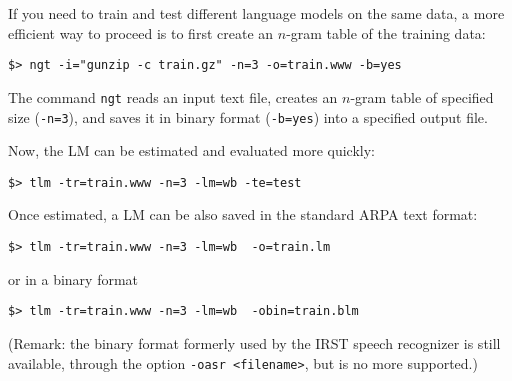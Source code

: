 \noindent
If you need  to train and test different language  models on the same data, a  more efficient 
way to  proceed is to first  create an $n$-gram table of the training data:
\begin{verbatim}
$> ngt -i="gunzip -c train.gz" -n=3 -o=train.www -b=yes
\end{verbatim}
\noindent
The command {\tt ngt} reads an  input text file, creates an  $n$-gram table of specified size ({\tt -n=3}), and 
saves it in binary format ({\tt -b=yes}) into a specified output file.

\noindent
Now,  the  LM can  be  estimated and evaluated more quickly:
\begin{verbatim}
$> tlm -tr=train.www -n=3 -lm=wb -te=test
\end{verbatim}

\noindent
Once  estimated, a  LM can  be also saved in the standard ARPA text format:
\begin{verbatim}
$> tlm -tr=train.www -n=3 -lm=wb  -o=train.lm
\end{verbatim}
or in a binary format 
\begin{verbatim}
$> tlm -tr=train.www -n=3 -lm=wb  -obin=train.blm
\end{verbatim}

\noindent
(Remark: the  binary format formerly used by the IRST speech recognizer is still available, through the option
{\tt -oasr <filename>}, but is no more supported.)

